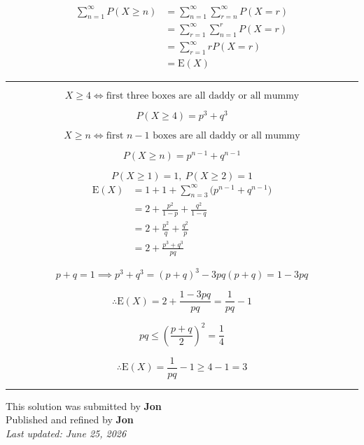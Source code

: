 \documentclass[12pt]{article}
\begin{document}
\newcommand{\ds}{\displaystyle}

\begin{align*}
\sum_{n=1}^{\infty}P(X\geq n)
&=\sum_{n=1}^{\infty}\sum_{r=n}^{\infty}P(X=r)\\
&=\sum_{r=1}^{\infty}\sum_{n=1}^{r}P(X=r)\\
&=\sum_{r=1}^{\infty}rP(X=r)\\
&=\mathrm{E}(X)
\end{align*}

\bigskip\hrule\bigskip

$$X\geq4\iff \text{first three boxes are all daddy or all mummy}$$

$$P(X\geq4)=p^3+q^3$$

$$X\geq n\iff \text{first }n-1\text{ boxes are all daddy or all mummy}$$

$$P(X\geq n)=p^{n-1}+q^{n-1}$$

$$P(X\geq1)=1,\  P(X\geq2)=1$$
\begin{align*}
\mathrm{E}(X)
&=1+1+\sum_{n=3}^{\infty}\bigl(p^{n-1}+q^{n-1}\bigr)\\
&=2+\frac{p^2}{1-p}+\frac{q^2}{1-q}\\
&=2+\frac{p^2}{q}+\frac{q^2}{p}\\
&=2+\frac{p^3+q^3}{pq}
\end{align*}

$$p+q=1\implies p^3+q^3=(p+q)^3-3pq(p+q)=1-3pq$$

$$\therefore \mathrm{E}(X)=2+\frac{1-3pq}{pq}=\frac1{pq}-1$$

$$pq\leq\left(\frac{p+q}{2}\right)^2=\frac14$$

$$\therefore \mathrm{E}(X)=\frac1{pq}-1\geq4-1=3$$

\bigskip
\hrule
\begin{center}
    This solution was submitted by \textbf{Jon}\\[4pt]
    Published and refined by \textbf{Jon}\\[8pt]
    \textit{Last updated: June 25, 2026}
\end{center}
\end{document}
